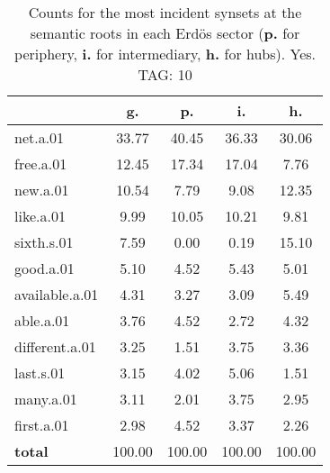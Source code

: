 \begin{table}[h!]
\begin{center}
\begin{tabular}{| l | c | c | c | c |}\hline
 & g. & p. & i. & h. \\\hline
net.a.01 & 33.77  & 40.45  & 36.33  & 30.06 \\\hline
free.a.01 & 12.45  & 17.34  & 17.04  & 7.76 \\\hline
new.a.01 & 10.54  & 7.79  & 9.08  & 12.35 \\\hline
like.a.01 & 9.99  & 10.05  & 10.21  & 9.81 \\\hline
sixth.s.01 & 7.59  & 0.00  & 0.19  & 15.10 \\\hline
good.a.01 & 5.10  & 4.52  & 5.43  & 5.01 \\\hline
available.a.01 & 4.31  & 3.27  & 3.09  & 5.49 \\\hline
able.a.01 & 3.76  & 4.52  & 2.72  & 4.32 \\\hline
different.a.01 & 3.25  & 1.51  & 3.75  & 3.36 \\\hline
last.s.01 & 3.15  & 4.02  & 5.06  & 1.51 \\\hline
many.a.01 & 3.11  & 2.01  & 3.75  & 2.95 \\\hline
first.a.01 & 2.98  & 4.52  & 3.37  & 2.26 \\\hline
{{\bf total}} & 100.00  & 100.00  & 100.00  & 100.00 \\\hline
\end{tabular}
\caption{Counts for the most incident synsets at the semantic roots in each Erd\"os sector ({\bf p.} for periphery, {\bf i.} for intermediary, {\bf h.} for hubs). Yes. TAG: 10}
\end{center}
\end{table}